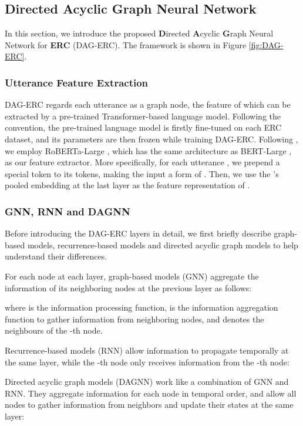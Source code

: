 \documentclass[11pt,a4paper]{article}
\begin{document}
\subsection{Directed Acyclic Graph Neural Network}

In this section, we introduce the proposed \textbf{D}irected \textbf{A}cyclic \textbf{G}raph Neural Network for \textbf{ERC} (DAG-ERC). The framework is shown in Figure \ref{fig:DAG-ERC}. 

\subsubsection{Utterance Feature Extraction}
DAG-ERC regards each utterance as a graph node, the feature of which can be extracted by a pre-trained Transformer-based language model. Following the convention, the pre-trained language model is firstly fine-tuned on each ERC dataset, and its parameters are then frozen while training DAG-ERC. 
Following \citet{ghosal2020cosmic}, we employ RoBERTa-Large \citep{liu2019roberta}, which has the same architecture as BERT-Large \citep{devlin2018bert}, as our feature extractor. More specifically, for each utterance , we prepend a special token  to its tokens, making the input a form of . Then, we use the 's pooled embedding at the last layer as the feature representation of .


\subsubsection{GNN, RNN and DAGNN}\label{sec:GNN_RNN_DAGNN}

Before introducing the DAG-ERC layers in detail, we first briefly describe graph-based models, recurrence-based models and directed acyclic graph models to help understand their differences.

For each node at each layer, graph-based models (GNN) aggregate the information of its neighboring nodes at the previous layer as follows:

where  is the information processing function,  is the information aggregation function to gather information from neighboring nodes, and  denotes the neighbours of the -th node. 

Recurrence-based models (RNN) allow information to propagate temporally at the same layer, while the -th node only receives information from the -th node:


Directed acyclic graph models (DAGNN) work like a combination of GNN and RNN. They aggregate information for each node in temporal order, and allow all nodes to gather information from neighbors and update their states at the same layer:
\vspace{-0.4cm}
\end{document}
